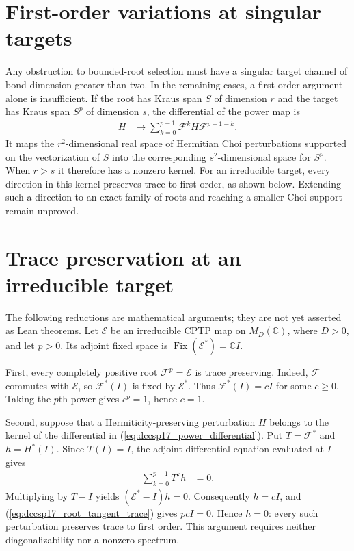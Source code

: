 \documentclass{article}
\begin{document}
\section{First-order variations at singular targets}

Any obstruction to bounded-root selection must have a singular target
channel of bond dimension greater than two. In the remaining cases, a first-order argument alone is
insufficient. If the root has Kraus span $S$ of dimension $r$
and the target has Kraus span $S^p$ of dimension $s$, the differential
of the power map is
\begin{align}
  H&\longmapsto
     \sum_{k=0}^{p-1}\mathcal F^k H\mathcal F^{p-1-k}.
  \label{eq:dccsp17_power_differential}
\end{align}
It maps the $r^2$-dimensional real space of Hermitian Choi perturbations
supported on the vectorization of $S$ into the corresponding
$s^2$-dimensional space for $S^p$. When $r>s$ it therefore has a nonzero
kernel. For an irreducible target, every direction in this kernel preserves
trace to first order, as shown below. Extending such a direction to an
exact family of roots and reaching a smaller Choi support remain unproved.

\section{Trace preservation at an irreducible target}

The following reductions are mathematical arguments; they are not yet
asserted as Lean theorems. Let $\mathcal E$ be an irreducible CPTP map on
$M_D(\mathbb C)$, where $D>0$, and let $p>0$. Its adjoint fixed space is
$\operatorname{Fix}(\mathcal E^*)=\mathbb C I$.

First, every completely positive root $\mathcal F^p=\mathcal E$ is
trace preserving. Indeed, $\mathcal F$ commutes with $\mathcal E$, so
$\mathcal F^*(I)$ is fixed by $\mathcal E^*$. Thus
$\mathcal F^*(I)=cI$ for some $c\ge0$. Taking the $p$th power gives
$c^p=1$, hence $c=1$.

Second, suppose that a Hermiticity-preserving perturbation $H$ belongs to
the kernel of the differential in
(\ref{eq:dccsp17_power_differential}). Put $T=\mathcal F^*$ and
$h=H^*(I)$. Since $T(I)=I$, the adjoint differential equation evaluated
at $I$ gives
\begin{align}
  \sum_{k=0}^{p-1}T^k h&=0.
  \label{eq:dccsp17_root_tangent_trace}
\end{align}
Multiplying by $T-I$ yields $(\mathcal E^*-I)h=0$. Consequently $h=cI$,
and (\ref{eq:dccsp17_root_tangent_trace}) gives $pcI=0$. Hence $h=0$:
every such perturbation preserves trace to first order. This argument
requires neither diagonalizability nor a nonzero spectrum.
\end{document}
